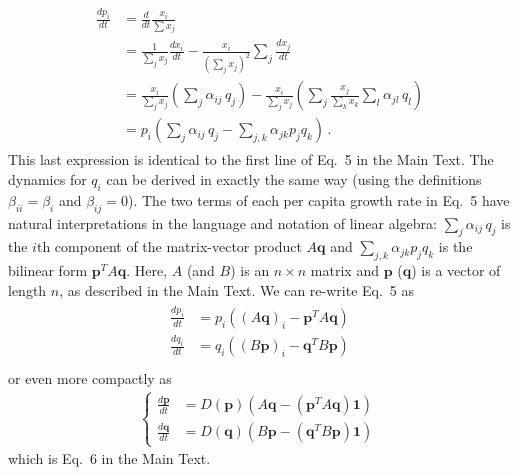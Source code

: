 \documentclass[11pt]{article}
\begin{document}
\begin{align} \label{derive_relative}
\begin{split}
	\frac{dp_i}{dt} &= \frac{d}{dt} \frac{x_i}{\sum x_j}\\  
	&= \frac{1}{\sum_j x_j} \frac{dx_i}{dt} - \frac{x_i}{(\sum_j x_j)^2} \sum_j \frac{dx_j}{dt} \\
	&= \frac{x_i}{\sum_j x_j} \left( \sum_{j} \alpha_{ij} \, q_j \right) - \frac{x_i}{\sum_j x_j} \left(\sum_j \frac{x_j}{\sum_k x_k} \sum_{l} \alpha_{jl} \, q_l \right)\\
	&= p_i \left(\sum_{j} \alpha_{ij} \, q_j -  \sum_{j, k} \alpha_{jk} p_j  q_k \right) \, .
\end{split}
\end{align}
This last expression is identical to the first line of Eq.~5 in the Main Text. The dynamics for $q_i$ can be derived in exactly the same way (using the definitions $\beta_{ii} = \beta_i$ and $\beta_{ij} = 0$). The two terms of each per capita growth rate in Eq.~5 have natural interpretations in the language and notation of linear algebra: $\sum_{j} \alpha_{ij} \, q_j$ is the $i$th component of the matrix-vector product $A \bm{q}$ and $\sum_{j, k} \alpha_{jk} p_j  q_k$ is the bilinear form $\bm{p}^T A \bm{q}$. Here, $A$ (and $B$) is an $n \times n$ matrix and $\bm{p}$ ($\bm{q}$) is a vector of length $n$, as described in the Main Text. We can re-write Eq.~5 as
\begin{align}
\begin{split}
	\frac{dp_i}{dt} &= p_i \left((A \bm{q})_i - \bm{p}^T A \bm{q} \right) \\
	\frac{dq_i}{dt} &= q_i \left((B \bm{p})_i - \bm{q}^T B \bm{p} \right) \\
\end{split}
\end{align}
or even more compactly as
\begin{align}
\begin{cases}
\frac{d\bm{p}}{dt} &= D(\bm{p}) \left(A \bm{q} - (\bm{p}^T A \bm{q}) \bm{1} \right) \\
\frac{d\bm{q}}{dt} &= D(\bm{q}) \left(B \bm{p} - (\bm{q}^T B \bm{p}) \bm{1}  \right) \,
\end{cases}
\end{align}
which is Eq.~6 in the Main Text.
\end{document}
